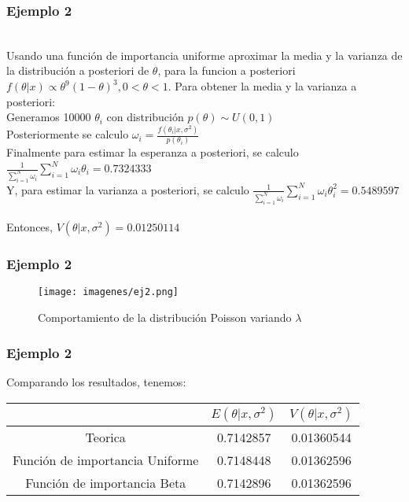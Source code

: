 \documentclass[12pt]{beamer}
\begin{document}
\begin{frame}
\frametitle{Ejemplo 2}
~\\ Usando una función de importancia uniforme aproximar la media y la varianza de la distribución a posteriori de $\theta$, para la funcion a posteriori $f(\theta|x)\propto \theta^9(1-\theta)^3, 0<\theta<1$. Para obtener la media y la varianza a posteriori:
~\\Generamos 10000 $\theta_{i}$ con distribución $p(\theta)\sim U(0,1)$
~\\Posteriormente se calculo $\omega_{i}=\frac{f(\theta_{i}|x,\sigma^2)}{p(\theta_{i})}$
~\\Finalmente para estimar la esperanza a posteriori, se calculo $\frac{1}{\sum\limits_{i=1}^{N}\omega_{i}}\sum\limits_{i=1}^{N}\omega_{i}\theta_{i}=0.7324333$
~\\Y, para estimar la varianza a posteriori, se calculo $\frac{1}{\sum\limits_{i=1}^{N}\omega_{i}}\sum\limits_{i=1}^{N}\omega_{i}\theta_{i}^2=0.5489597$
~\\Entonces, $V(\theta|x,\sigma^2)=0.01250114$
\end{frame}

\begin{frame}
\frametitle{Ejemplo 2}
\begin{figure}[!h]
    \begin{center}
        \texttt{[image: imagenes/ej2.png]}
        \caption{Comportamiento de la distribución Poisson variando $\lambda$}
        \label{fig:Densidad}
    \end{center}
\end{figure}
\end{frame}

\begin{frame}
\frametitle{Ejemplo 2}
Comparando los resultados, tenemos:
\begin{tabular}{|c|c|c|}
\hline 
 & $E(\theta|x,\sigma^2)$ & $V(\theta|x,\sigma^2)$ \\ 
\hline 
Teorica & 0.7142857 & 0.01360544 \\ 
Función de importancia Uniforme &  0.7148448 & 0.01362596 \\ 
Función de importancia Beta & 0.7142896 & 0.01362596 \\
\hline 
\end{tabular} 
\end{frame}
\end{document}
